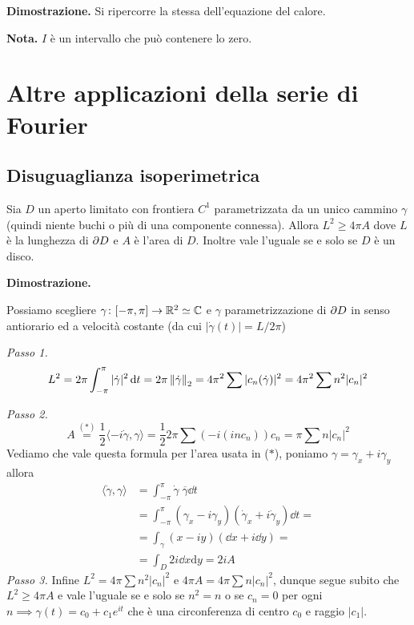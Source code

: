 \textbf{Dimostrazione.}
Si ripercorre la stessa dell'equazione del calore.

\textbf{Nota.} $I$ è un intervallo che può contenere lo zero.


\section{Altre applicazioni della serie di Fourier}

\subsection{Disuguaglianza isoperimetrica}

Sia $D$ un aperto limitato con frontiera $C^1$ parametrizzata da un unico cammino $\gamma$ (quindi niente buchi o più di una componente connessa). Allora $L^2 \geq 4 \pi A$ dove $L$ è la lunghezza di $\partial D$ e $A$ è l'area di $D$. Inoltre vale l'uguale se e solo se $D$ è un disco.

\textbf{Dimostrazione.}

Possiamo scegliere $\gamma \colon [-\pi, \pi] \to \mathbb R^2 \simeq \mathbb C$ e $\gamma$ parametrizzazione di $\partial D$ in senso antiorario ed a velocità costante (da cui $|\dot\gamma(t)| = L / 2\pi$)

\textit{Passo 1.}
$$
L^2 = 2\pi \int_{-\pi}^\pi |\dot \gamma|^2 \,\mathrm{d} t = 2\pi \left\lVert \dot \gamma \right\rVert_2 = 4 \pi^2 \sum |c_n(\dot \gamma)|^2 = 4 \pi^2 \sum n^2 |c_n|^2
$$

\textit{Passo 2.}
$$
A \overset{(*)}{=} \frac{1}{2}\langle -i\dot\gamma, \gamma \rangle = \frac{1}{2} 2\pi \sum (-i (inc_n))c_n = \pi \sum n |c_n|^2
$$
Vediamo che vale questa formula per l'area usata in ($*$), poniamo $\gamma = \gamma_x + i \gamma_y$ allora
$$
\begin{aligned}
	\langle \dot\gamma, \gamma \rangle 
	&= \int_{-\pi}^\pi \dot\gamma \; \overline\gamma \dd t \\
	&= \int_{-\pi}^\pi (\gamma_x - i \gamma_y) (\dot\gamma_x + i \dot\gamma_y) \dd t = \\
	&= \int_\gamma (x - iy) (\dd x + i \dd y) = \\
	&= \int_D 2i \dd x \mathrm d y = 2i A
\end{aligned}
$$
\textit{Passo 3.}
Infine $L^2 = 4 \pi \sum n^2 |c_n|^2$ e $4\pi A = 4\pi \sum n |c_n|^2$, dunque segue subito che $L^2 \geq 4 \pi A$ e vale l'uguale se e solo se $n^2 = n$ o se $c_n = 0$ per ogni $n \implies \gamma(t) = c_0 + c_1 e^{it}$ che è una circonferenza di centro $c_0$ e raggio $|c_1|$.




